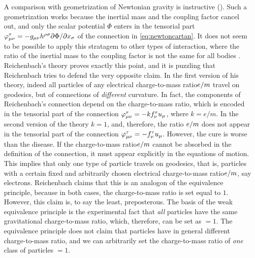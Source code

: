 \documentclass[final]{article}
\newcommand{\ctmr}{charge-to-mass ratio\xspace}
\newcommand{\ctmrf}{\ensuremath{\hfrac{e}{m}}\xspace}
\newcommand{\RTo}{\ensuremath{\varphi\tmn=-k f^\tau_\nu u_\mu}\xspace}
\newcommand{\RTt}{\ensuremath{\varphi\tmn=-f^\tau_\nu u_\mu}\xspace}
\newcommand{\FT}{\ensuremath{\varphi\tmn = - g_{\mu \nu} h^{\rho \sigma} \hfrac{\partial \Phi}{\partial x_\sigma}}\xspace}
\begin{document}
A comparison with  geometrization of Newtonian gravity is instructive (). Such a  geometrization works because the inertial mass and the coupling factor cancel out, and only the scalar potential $\Phi$ enters in the tensorial part \FT of the connection in \cref{eq:newtoncartan}. It does not seem to be possible to apply this stratagem to other types of interaction, where the ratio of the inertial mass to the coupling factor is not the same for all bodies \citep[197]{Friedman1983}. Reichenbach's theory proves exactly this point, and it is puzzling that Reichenbach tries to defend the very opposite claim. In the first version of his theory, indeed all particles of any electrical \ctmr \ctmrf travel on geodesics, but of connections of \emph{different} curvature. In fact, the components of Reichenbach's connection depend on the \ctmr, which is encoded in the tensorial part of the connection \RTo, where $k= e/m$. In the second version of the theory $k=1$, and, therefore, the ratio \ctmrf does not appear in the tensorial part of the connection \RTt. However, the cure is worse than the disease. If the \ctmr \ctmrf cannot be absorbed in the definition of the connection, it must appear explicitly in the equations of motion. This implies that only one type of particle travels on geodesics, that is, particles with a certain fixed and arbitrarily chosen electrical \ctmr \ctmrf, say electrons. Reichenbach claims that this is an analogon of the equivalence principle, because in both cases, the \ctmr is set equal to $1$. However, this claim is, to say the least, preposterous. The basis of the weak equivalence principle is the experimental fact that \emph{all} particles have the same gravitational \ctmr, which, therefore, can be set as $=1$. The equivalence principle does not claim that particles have in general different \ctmr, and we can arbitrarily set  the \ctmr of \emph{one} class of particles $=1$. 
\end{document}
